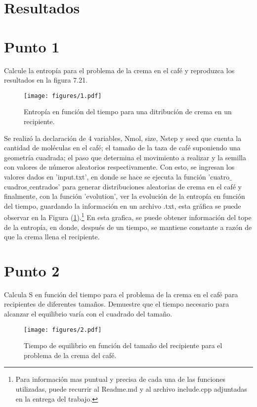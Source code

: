 \documentclass{article}
\begin{document}
\section*{Resultados}
\section*{Punto 1}
    Calcule la entropía para el problema de la crema en el café y reproduzca los resultados en la figura 7.21.

    \begin{figure}[h]
        \centering
        \texttt{[image: figures/1.pdf]}
        \caption{Entropía en función del tiempo para una ditribución de crema en un recipiente.}
        \label{Graficapunto1}
    \end{figure}

    Se realizó la declaración de 4 variables, Nmol, size, Nstep y seed que cuenta la cantidad de moléculas en el café; el tamaño de la taza de café suponiendo una geometría cuadrada; el paso que determina el movimiento a realizar y la semilla con valores de números aleatorios respectivamente. Con esto, se ingresan los valores dados en 'input.txt', en donde se hace se ejecuta la función 'cuatro$\_$cuadros$\_$centrados' para generar distribuciones aleatorias de crema en el café y finalmente, con la función 'evolution', ver la evolución de la entropía en función del tiempo, guardando la información en un archivo .txt, esta gráfica se puede observar en la Figura (\ref{Graficapunto1}).\footnote{Para información mas puntual y precisa de cada una de las funciones utilizadas, puede recurrir al Readme.md y al archivo include.cpp adjuntadas en la entrega del trabajo.} En esta grafica, se puede obtener información del tope de la entropía, en donde, después de un tiempo, se mantiene constante a razón de que la crema llena el recipiente.

    
    
\section*{Punto 2}
    Calcula S en función del tiempo para el problema de la crema en el café para recipientes de diferentes tamaños. Demuestre que el tiempo necesario para alcanzar el equilibrio varía con el cuadrado del tamaño.

    \begin{figure}[h]
        \centering
        \texttt{[image: figures/2.pdf]}
        \caption{Tiempo de equilibrio en función del tamaño del recipiente para el problema de la crema del café.}
        \label{Graficapunto2}
    \end{figure}
\end{document}
